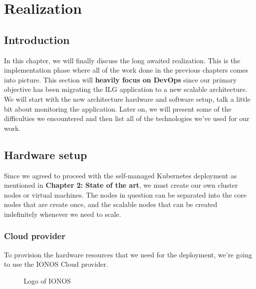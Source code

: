 \chapter{Realization}
\newpage

\setcounter{secnumdepth}{0} %
\section{Introduction}
In this chapter, we will finally discuss the long awaited realization.
This is the implementation phase where all of the work done in the previous chapters comes into picture.
This section will {\bf heavily focus on DevOps} since our primary objective has been migrating the ILG application to a new scalable architecture.
We will start with the new architecture hardware and software setup, talk a little bit about monitoring the application.
Later on, we will present some of the difficulties we encountered and then list all of the technologies we've used for our work.

\setcounter{secnumdepth}{2} %
\section{Hardware setup}
Since we agreed to proceed with the self-managed Kubernetes deployment as mentioned in \textbf{Chapter 2: State of the art}, we must create our own cluster nodes or virtual machines.
The nodes in question can be separated into the core nodes that are create once, and the scalable nodes that can be created indefinitely whenever we need to scale.

\subsection{Cloud provider}
To provision the hardware resources that we need for the deployment, we're going  to use the IONOS Cloud provider.
\cite[Ionos is a web hosting company founded in Germany in 1988 and is currently owned by United Internet.]{ionos-wikipedia}
\begin{figure}[H]
    \centering
    \caption{Logo of IONOS}
    \label{fig:logo-of-ionos-cloud}
\end{figure}

